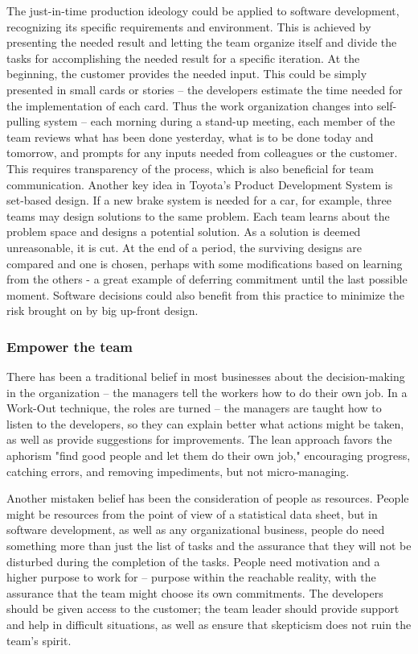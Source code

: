 The just-in-time production ideology could be applied to software development, recognizing its specific requirements and environment. This is achieved by presenting the needed result and letting the team organize itself and divide the tasks for accomplishing the needed result for a specific iteration. At the beginning, the customer provides the needed input. This could be simply presented in small cards or stories – the developers estimate the time needed for the implementation of each card. Thus the work organization changes into self-pulling system – each morning during a stand-up meeting, each member of the team reviews what has been done yesterday, what is to be done today and tomorrow, and prompts for any inputs needed from colleagues or the customer. This requires transparency of the process, which is also beneficial for team communication. Another key idea in Toyota's Product Development System is set-based design. If a new brake system is needed for a car, for example, three teams may design solutions to the same problem. Each team learns about the problem space and designs a potential solution. As a solution is deemed unreasonable, it is cut. At the end of a period, the surviving designs are compared and one is chosen, perhaps with some modifications based on learning from the others - a great example of deferring commitment until the last possible moment. Software decisions could also benefit from this practice to minimize the risk brought on by big up-front design.

\subsubsection{Empower the team}

There has been a traditional belief in most businesses about the decision-making in the organization – the managers tell the workers how to do their own job. In a Work-Out technique, the roles are turned – the managers are taught how to listen to the developers, so they can explain better what actions might be taken, as well as provide suggestions for improvements. The lean approach favors the aphorism "find good people and let them do their own job," encouraging progress, catching errors, and removing impediments, but not micro-managing.

Another mistaken belief has been the consideration of people as resources. People might be resources from the point of view of a statistical data sheet, but in software development, as well as any organizational business, people do need something more than just the list of tasks and the assurance that they will not be disturbed during the completion of the tasks. People need motivation and a higher purpose to work for – purpose within the reachable reality, with the assurance that the team might choose its own commitments. The developers should be given access to the customer; the team leader should provide support and help in difficult situations, as well as ensure that skepticism does not ruin the team’s spirit.


